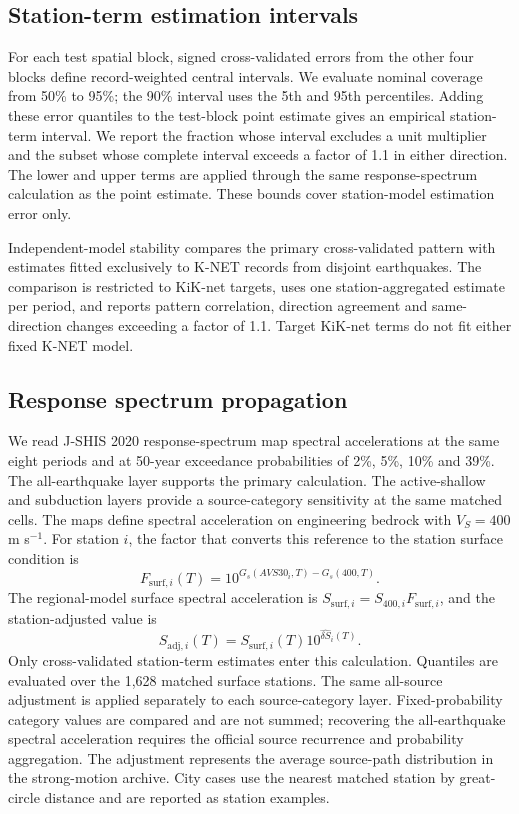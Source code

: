 \documentclass[11pt]{article}
\begin{document}
\subsection{Station-term estimation intervals}

For each test spatial block, signed cross-validated errors from the other four blocks define record-weighted central intervals. We evaluate nominal coverage from 50\% to 95\%; the 90\% interval uses the 5th and 95th percentiles. Adding these error quantiles to the test-block point estimate gives an empirical station-term interval. We report the fraction whose interval excludes a unit multiplier and the subset whose complete interval exceeds a factor of 1.1 in either direction. The lower and upper terms are applied through the same response-spectrum calculation as the point estimate. These bounds cover station-model estimation error only.

Independent-model stability compares the primary cross-validated pattern with estimates fitted exclusively to K-NET records from disjoint earthquakes. The comparison is restricted to KiK-net targets, uses one station-aggregated estimate per period, and reports pattern correlation, direction agreement and same-direction changes exceeding a factor of 1.1. Target KiK-net terms do not fit either fixed K-NET model.

\subsection{Response spectrum propagation}

We read J-SHIS 2020 response-spectrum map spectral accelerations at the same eight periods and at 50-year exceedance probabilities of 2\%, 5\%, 10\% and 39\%\cite{azuma2013,fujiwara2023,erc2022}. The all-earthquake layer supports the primary calculation. The active-shallow and subduction layers provide a source-category sensitivity at the same matched cells. The maps define spectral acceleration on engineering bedrock with $V_S=400$ m s$^{-1}$. For station $i$, the factor that converts this reference to the station surface condition is
\begin{equation}
F_{\mathrm{surf},i}(T)=10^{G_s(AVS30_i,T)-G_s(400,T)}.
\end{equation}
The regional-model surface spectral acceleration is $S_{\mathrm{surf},i}=S_{400,i}F_{\mathrm{surf},i}$, and the station-adjusted value is
\begin{equation}
S_{\mathrm{adj},i}(T)=S_{\mathrm{surf},i}(T)10^{\widehat{\delta S}_i(T)}.
\end{equation}
Only cross-validated station-term estimates enter this calculation. Quantiles are evaluated over the 1,628 matched surface stations. The same all-source adjustment is applied separately to each source-category layer. Fixed-probability category values are compared and are not summed; recovering the all-earthquake spectral acceleration requires the official source recurrence and probability aggregation. The adjustment represents the average source-path distribution in the strong-motion archive. City cases use the nearest matched station by great-circle distance and are reported as station examples.
\end{document}
